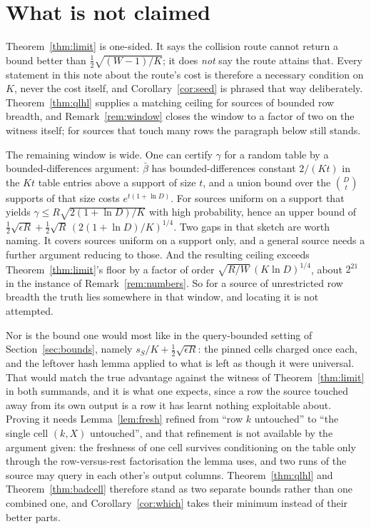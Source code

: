\documentclass{aicr-solution}
\begin{document}
\section{What is not claimed}\label{sec:not}

Theorem~\ref{thm:limit} is one-sided. It says the collision route cannot return a bound better than
$\tfrac12\sqrt{(W-1)/K}$; it does \emph{not} say the route attains that. Every statement in this
note about the route's cost is therefore a necessary condition on $K$, never the cost itself, and
Corollary~\ref{cor:seed} is phrased that way deliberately. Theorem~\ref{thm:qlhl} supplies a
matching ceiling for sources of bounded row breadth, and Remark~\ref{rem:window} closes the window
to a factor of two on the witness itself; for sources that touch many rows the paragraph below still
stands.

The remaining window is wide. One can certify $\gamma$ for a random table by a bounded-differences
argument: $\bar\beta$ has bounded-differences constant $2/(Kt)$ in the $Kt$ table entries above a
support of size $t$, and a union bound over the $\binom{D}{t}$ supports of that size costs
$e^{t(1+\ln D)}$. For sources uniform on a support that yields $\gamma \le R\sqrt{2(1+\ln D)/K}$
with high probability, hence an upper bound of
$\tfrac12\sqrt{\epsilon R} + \tfrac12\sqrt R\,(2(1+\ln D)/K)^{1/4}$. Two gaps in that sketch are
worth naming. It covers sources uniform on a support only, and a general source needs a further
argument reducing to those. And the resulting ceiling exceeds Theorem~\ref{thm:limit}'s floor by a
factor of order $\sqrt{R/W}\,(K\ln D)^{1/4}$, about $2^{21}$ in the instance of
Remark~\ref{rem:numbers}. So for a source of unrestricted row breadth the truth lies somewhere in
that window, and locating it is not attempted.

Nor is the bound one would most like in the query-bounded setting of Section~\ref{sec:bounds}, namely
$s_S/K + \tfrac12\sqrt{\epsilon R}$: the pinned cells charged once each, and the leftover hash lemma
applied to what is left as though it were universal. That would match the true advantage against the
witness of Theorem~\ref{thm:limit} in both summands, and it is what one expects, since a row the
source touched away from its own output is a row it has learnt nothing exploitable about. Proving it
needs Lemma~\ref{lem:fresh} refined from ``row $k$ untouched'' to ``the single cell $(k,X)$
untouched'', and that refinement is not available by the argument given: the freshness of one cell
survives conditioning on the table only through the row-versus-rest factorisation the lemma uses,
and two runs of the source may query in each other's output columns. Theorem~\ref{thm:qlhl} and
Theorem~\ref{thm:badcell} therefore stand as two separate bounds rather than one combined one, and
Corollary~\ref{cor:which} takes their minimum instead of their better parts.
\end{document}
